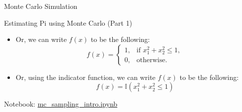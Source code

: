 \documentclass{beamer}
\begin{document}
\begin{section}{Monte Carlo Simulation}
    \begin{frame}[fragile]{Estimating Pi using Monte Carlo (Part 1)}

        \begin{itemize}
        \item Or, we can write $f(x)$ to be the following:
            \[
            f(x) = \begin{cases}
                        1, & \text{if } x_1^2 + x_2^2 \leq 1, \\
                        0, & \text{otherwise}.
                   \end{cases}
            \]
        \item Or, using the indicator function, we can write $f(x)$ to be the following:
            \[
            f(x) = \mathbb{I}(x_1^2 + x_2^2 \leq 1)
            \]
        \end{itemize}
        
        \begin{center}
        \end{center}
    \end{frame}

    \begin{frame}
        Notebook: \url{mc_sampling_intro.ipynb}
    \end{frame}

\end{section}
\end{document}
